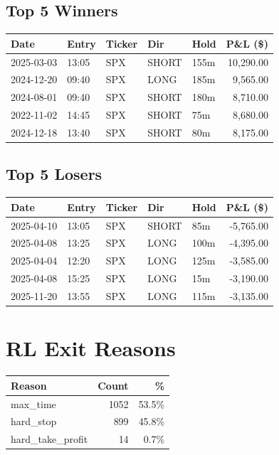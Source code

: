 \documentclass[11pt,a4paper,twoside]{article}
\begin{document}
\subsection{Top 5 Winners}
\noindent\begin{center}
\begin{tabular}{>{\color{txtmain}}l llll r}
\toprule
\rowcolor{cardbg}
\textbf{Date} & \textbf{Entry} & \textbf{Ticker} & \textbf{Dir} & \textbf{Hold} & \textbf{P\&L (\$)} \\
\midrule
2025-03-03 & 13:05 & SPX & SHORT & 155m & \textcolor{wingreen}{10,290.00} \\
2024-12-20 & 09:40 & SPX & LONG & 185m & \textcolor{wingreen}{9,565.00} \\
2024-08-01 & 09:40 & SPX & SHORT & 180m & \textcolor{wingreen}{8,710.00} \\
2022-11-02 & 14:45 & SPX & SHORT & 75m & \textcolor{wingreen}{8,680.00} \\
2024-12-18 & 13:40 & SPX & SHORT & 80m & \textcolor{wingreen}{8,175.00} \\
\bottomrule
\end{tabular}
\end{center}
\subsection{Top 5 Losers}
\noindent\begin{center}
\begin{tabular}{>{\color{txtmain}}l llll r}
\toprule
\rowcolor{cardbg}
\textbf{Date} & \textbf{Entry} & \textbf{Ticker} & \textbf{Dir} & \textbf{Hold} & \textbf{P\&L (\$)} \\
\midrule
2025-04-10 & 13:05 & SPX & SHORT & 85m & \textcolor{lossred}{-5,765.00} \\
2025-04-08 & 13:25 & SPX & LONG & 100m & \textcolor{lossred}{-4,395.00} \\
2025-04-04 & 12:20 & SPX & LONG & 125m & \textcolor{lossred}{-3,585.00} \\
2025-04-08 & 15:25 & SPX & LONG & 15m & \textcolor{lossred}{-3,190.00} \\
2025-11-20 & 13:55 & SPX & LONG & 115m & \textcolor{lossred}{-3,135.00} \\
\bottomrule
\end{tabular}
\end{center}
\clearpage
\section{RL Exit Reasons}
\noindent\begin{center}
\begin{tabular}{>{\color{txtmain}}l rr}
\toprule
\rowcolor{cardbg}
\textbf{Reason} & \textbf{Count} & \textbf{\%} \\
\midrule
max\_time & 1052 & 53.5\% \\
hard\_stop & 899 & 45.8\% \\
hard\_take\_profit & 14 & 0.7\% \\
\bottomrule
\end{tabular}
\end{center}
\end{document}
